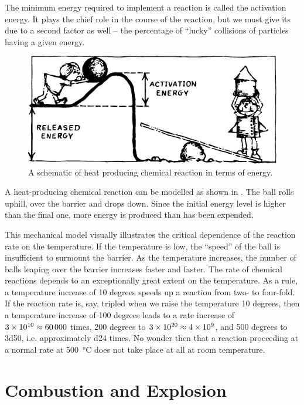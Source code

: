 The minimum energy required to implement a reac­tion is called the activation energy. It plays the chief role in the course of the reaction, but we must give its due to a second factor as well -- the percentage of ``lucky'' colli­sions of particles having a given energy.
\begin{figure}[!ht]
\centering
\includegraphics[width=\textwidth]{figures/fig-07-01.pdf}
\caption{A schematic of heat producing chemical reaction in terms of energy.}
\label{fig-7.1}
\end{figure}
A heat-producing chemical reaction can be modelled as shown in . The ball rolls uphill, over the barrier and drops down. Since the initial energy level is higher than the final one, more energy is produced than has been expended.

This mechanical model visually illustrates the critical dependence of the reaction rate on the temperature. If the temperature is low, the ``speed'' of the ball is insuffi­cient to surmount the barrier. As the temperature increas­es, the number of balls leaping over the barrier increases faster and faster. The rate of chemical reactions depends to an exceptionally great extent on the temperature. As a rule, a temperature increase of 10 degrees speeds up a reaction from two- to four-fold. If the reaction rate is, say, tripled when we raise the temperature 10 degrees, then a temperature increase of 100 degrees leads to a rate increase of $\num{3d10}\approx  \num{60 000}$ times, 200 degrees to $\num{3d20} \approx  \num{4d9}$, and 500 degrees to \num{3d50}, i.e. approximately \num{d24} times. No wonder then that a reaction proceeding at a normal rate at \SI{500}{\celsius} does not take place at all at room temperature.

\section{Combustion and Explosion}

